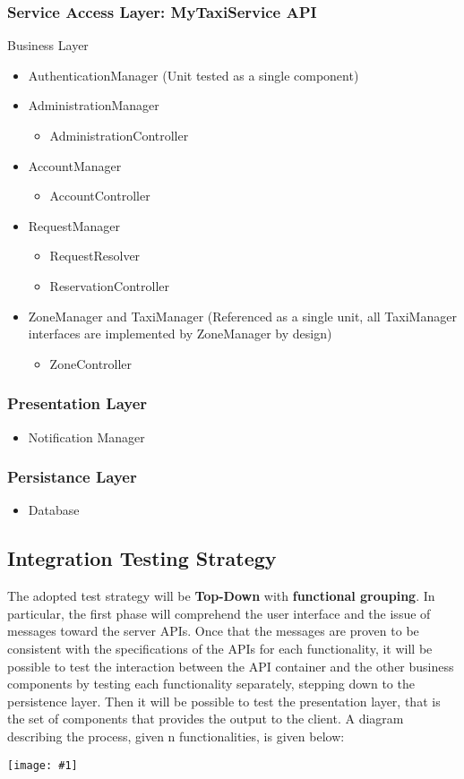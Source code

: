 \documentclass[11pt, a4paper,titlepage]{article}
\newcommand{\image}[1]{
	\begin{center}
		\noindent \texttt{[image: \#1]}
	\end{center}
}
\begin{document}
	\subsubsection{Service Access Layer: MyTaxiService API}
	Business Layer
	\begin{itemize}
		\item AuthenticationManager (Unit tested as a single component)
		\item AdministrationManager
		\begin{itemize}
			\item AdministrationController
		\end{itemize}
		\item AccountManager
		\begin{itemize}
			\item AccountController
		\end{itemize}
		\item RequestManager
		\begin{itemize}
			\item RequestResolver
			\item ReservationController
		\end{itemize}
		\item ZoneManager and TaxiManager (Referenced as a single unit, all TaxiManager interfaces are implemented by ZoneManager by design)
		\begin{itemize}
			\item ZoneController
		\end{itemize}
	\end{itemize}
	\subsubsection{Presentation Layer}
	\begin{itemize}
		\item Notification Manager
	\end{itemize}
	\subsubsection{Persistance Layer}
	\begin{itemize}
		\item Database
	\end{itemize}
	
	\newpage
	\subsection{Integration Testing Strategy}
	The adopted test strategy will be \textbf{ Top-Down } with \textbf{functional grouping}. 
	In particular, the first phase will comprehend the user interface and the issue of messages toward the server APIs. Once that the messages are proven to be consistent with the specifications of the APIs for each functionality, it will be possible to test the interaction between the API container and the other business components by testing each functionality separately, stepping down to the persistence layer. Then it will be possible to test the presentation layer, that is the set of components that provides the output to the client. 
	A diagram describing the process, given n functionalities, is given below:
	\image{TestingStrategy.png}
\end{document}

